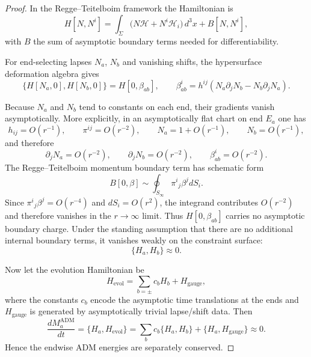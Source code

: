 \documentclass[aps,prd,onecolumn,nofootinbib,superscriptaddress]{revtex4-2}
\begin{document}
\begin{proof}
In the Regge--Teitelboim framework the Hamiltonian is
\begin{equation}
H[N,N^i]
=
\int_\Sigma \big(N\mathcal{H}+N^i\mathcal{H}_i\big)\, d^3x
+B[N,N^i],
\end{equation}
with $B$ the sum of asymptotic boundary terms needed for differentiability.\cite{ReggeTeitelboim1974SurfaceIntegrals}

For end-selecting lapses $N_a$, $N_b$ and vanishing shifts, the hypersurface deformation algebra gives
\begin{equation}
\{H[N_a,0],H[N_b,0]\}=H[0,\beta_{ab}],
\qquad
\beta_{ab}^i
=
h^{ij}(N_a\partial_j N_b-N_b\partial_j N_a).
\end{equation}
\cite{HojmanKucharTeitelboim1976Geometrodynamics}

Because $N_a$ and $N_b$ tend to constants on each end, their gradients vanish asymptotically. More explicitly, in an asymptotically flat chart on end $E_a$ one has
\begin{equation}
h_{ij}=O(r^{-1}),
\qquad
\pi^{ij}=O(r^{-2}),
\qquad
N_a=1+O(r^{-1}),
\qquad
N_b=O(r^{-1}),
\end{equation}
and therefore
\begin{equation}
\partial_j N_a=O(r^{-2}),
\qquad
\partial_j N_b=O(r^{-2}),
\qquad
\beta_{ab}^i=O(r^{-2}).
\end{equation}
The Regge--Teitelboim momentum boundary term has schematic form
\begin{equation}
B[0,\beta] \sim \oint_{S_\infty}\pi^i{}_j \beta^j dS_i.
\end{equation}
Since $\pi^i{}_j\beta^j=O(r^{-4})$ and $dS_i=O(r^2)$, the integrand contributes $O(r^{-2})$ and therefore vanishes in the $r\to\infty$ limit. Thus $H[0,\beta_{ab}]$ carries no asymptotic boundary charge. Under the standing assumption that there are no additional internal boundary terms, it vanishes weakly on the constraint surface:
\begin{equation}
\{H_a,H_b\}\approx 0.
\end{equation}

Now let the evolution Hamiltonian be
\begin{equation}
H_{\mathrm{evol}}=\sum_{b=\pm} c_b H_b + H_{\mathrm{gauge}},
\end{equation}
where the constants $c_b$ encode the asymptotic time translations at the ends and $H_{\mathrm{gauge}}$ is generated by asymptotically trivial lapse/shift data. Then
\begin{equation}
\frac{dM_a^{\mathrm{ADM}}}{dt}
=
\{H_a,H_{\mathrm{evol}}\}
=
\sum_b c_b \{H_a,H_b\}+\{H_a,H_{\mathrm{gauge}}\}
\approx 0.
\end{equation}
Hence the endwise ADM energies are separately conserved.
\end{proof}
\end{document}
